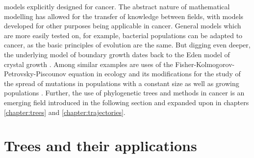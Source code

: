 models explicitly designed for cancer. The abstract nature of mathematical
modelling has allowed for the transfer of knowledge between fields, with models
developed for other purposes being applicable in cancer. General models which
are more easily tested on, for example, bacterial populations
\cite{fusco_excess_2016, schreck_impact_2023} can be adapted to cancer, as the
basic principles of evolution are the same. But digging even deeper, the
underlying model of boundary growth dates back to the Eden model of crystal
growth \cite{eden_two-dimensional_1961}. Among similar examples are uses of the
Fisher-Kolmogorov-Petrovsky-Piscounov equation in ecology and its modifications
for the study of the spread of mutations in populations with a constant size
\cite{houchmandzadeh_fisher_2017} as well as growing populations
\cite{wodarz_mutant_2020}. Further, the use of phylogenetic trees and methods
in cancer is an emerging field introduced in the following section and expanded
upon in chapters \ref{chapter:trees} and \ref{chapter:trajectories}.


\section{Trees and their applications}

